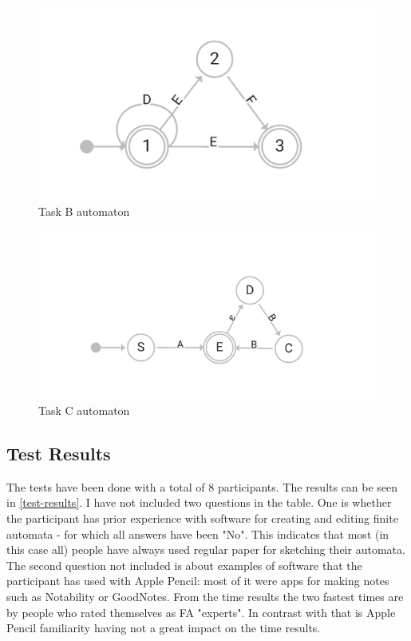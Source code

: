 \begin{figure}
    \includegraphics[width=\textwidth]{automaton_cycle}
    \caption{Task B automaton}\label{task-b-automaton}
\end{figure}

\begin{figure}
    \includegraphics[width=\textwidth]{epsilon_automaton}
    \caption{Task C automaton}\label{task-c-automaton}
\end{figure}

\subsection{Test Results}

The tests have been done with a total of 8 participants. The results can be seen in \ref{test-results}. I have not included two questions in the table. One is whether the participant has prior experience with software for creating and editing finite automata - for which all answers have been "No". This indicates that most (in this case all) people have always used regular paper for sketching their automata. The second question not included is about examples of software that the participant has used with Apple Pencil: most of it were apps for making notes such as Notability or GoodNotes. From the time results the two fastest times are by people who rated themselves as FA "experts". In contrast with that is Apple Pencil familiarity having not a great impact on the time results. 


